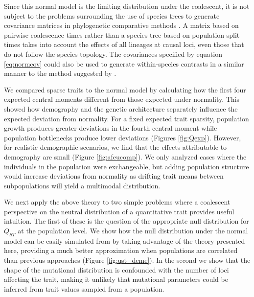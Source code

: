 Since this normal model is the limiting distribution under the coalescent, it is
not subject to the problems surrounding the use of species trees to generate
covariance matrices in phylogenetic comparative methods \citep{Mendes2018}. A
matrix based on pairwise coalescence times rather than a species tree based on
population split times takes into account the effects of all lineages at causal
loci, even those that do not follow the species topology. The covariances
specified by equation \eqref{eq:normcov} could also be used to generate
within-species contrasts in a similar manner to the method suggested
by \citet{Felsenstein2002}.

We compared sparse traits to the normal model by calculating how the first four
expected central moments different from those expected under normality. This
showed how demography and the genetic architecture separately influence the
expected deviation from normality. For a fixed expected trait sparsity,
population growth produces greater deviations in the fourth central moment while
population bottlenecks produce lower deviations (Figures
\ref{fig:Qexp}). However, for realistic demographic scenarios,
we find that the effects attributable to demography are small (Figure
\ref{fig:afeucomp}). We only analyzed cases where the individuals in the
population were exchangeable, but adding population structure would increase
deviations from normality as drifting trait means between subpopulations will
yield a multimodal distribution.

We next apply the above theory to two simple problems where a coalescent
perspective on the neutral distribution of a quantitative trait provides useful
intuition. The first of these is the question of the appropriate null
distribution for $Q_{ST}$ at the population level. We show how the null
distribution under the normal model can be easily simulated from by taking
advantage of the theory presented here, providing a much better approximation
when populations are correlated than previous approaches \citep{Whitlock2009}
(Figure \ref{fig:qst_deme}). In the second we show that the shape of the
mutational distribution is confounded with the number of loci affecting the
trait, making it unlikely that mutational parameters could be inferred from
trait values sampled from a population.

